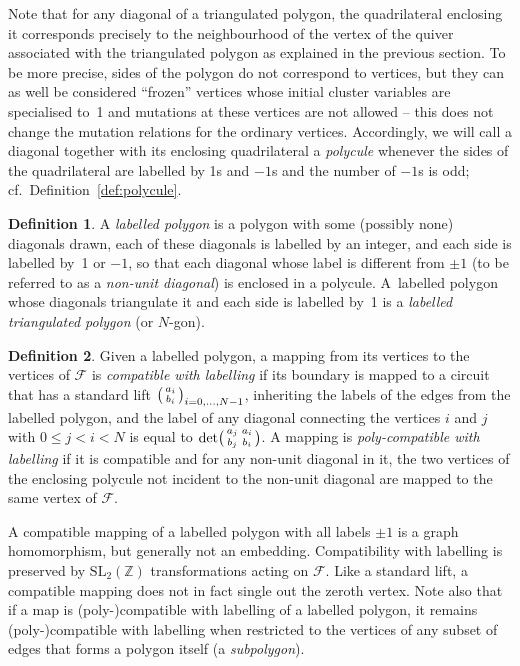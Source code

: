 \documentclass[12pt]{article}
\theoremstyle{definition}
\newtheorem{definition}{Definition}
\newcommand{\Z}{\mathbb{Z}}
\newcommand{\SL}[1]{\ensuremath{\mathrm{SL}_{#1}}}
\newcommand{\F}{\mathscr{F}}
\begin{document}
Note that for any diagonal of a triangulated polygon, the quadrilateral enclosing it corresponds precisely to the neighbourhood of the vertex of the quiver associated with the triangulated polygon as explained in the previous section. To be more precise, sides of the polygon do not correspond to vertices, but they can as well be considered ``frozen'' vertices whose initial cluster variables are specialised to~1 and mutations at these vertices are not allowed -- this does not change the mutation relations for the ordinary vertices. Accordingly, we will call a diagonal together with its enclosing quadrilateral a \emph{polycule} whenever the sides of the quadrilateral are labelled by 1s and $-1$s and the number of $-1$s is odd; cf.\ Definition~\ref{def:polycule}.
\begin{definition}
\label{def:labtr}
A \emph{labelled polygon} is a polygon with some (possibly none) diagonals drawn, each of these diagonals is labelled by an integer, and each side is labelled by~1 or $-1$, so that each diagonal whose label is different from $\pm1$ (to be referred to as a \emph{non-unit diagonal}) is enclosed in a polycule. A~labelled polygon whose diagonals triangulate it and each side is labelled by~1 is a \emph{labelled triangulated polygon} (or $N$-gon).
\end{definition}
\begin{definition}
Given a labelled polygon, a mapping from its vertices to the vertices of $\F$ is \emph{compatible with labelling} if its boundary is mapped to a circuit that has a standard lift $\begin{psmallmatrix}a_i\\b_i\end{psmallmatrix}_{i=0,\dots,N-1}$, inheriting the labels of the edges from the labelled polygon, and the label of any diagonal connecting the vertices $i$ and $j$ with $0\leqslant j< i<N$ is equal to $\det\begin{psmallmatrix}a_j&a_i\\b_j&b_i\end{psmallmatrix}$. A mapping is \emph{poly-compatible with labelling} if it is compatible and for any non-unit diagonal in it, the two vertices of the enclosing polycule not incident to the non-unit diagonal are mapped to the same vertex of $\F$.
\end{definition}
A compatible mapping of a labelled polygon with all labels $\pm1$ is a graph homomorphism, but generally not an embedding.
Compatibility with labelling is preserved by $\SL2(\Z)$ transformations acting on $\F$. Like a standard lift, a compatible mapping does not in fact single out the zeroth vertex. Note also that if a map is (poly-)compatible with labelling of a labelled polygon, it remains (poly-)compatible with labelling when restricted to the vertices of any subset of edges that forms a polygon itself (a \emph{subpolygon}).
\end{document}
